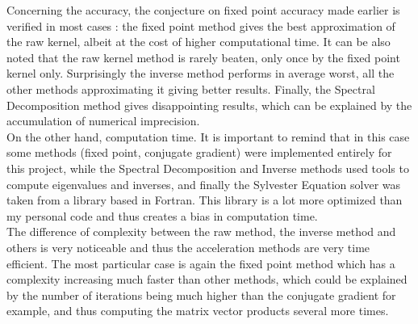 \documentclass{article}
\theoremstyle{definition}
\begin{document}
Concerning the accuracy, the conjecture on fixed point accuracy made earlier is verified in most cases : the fixed point method gives the best approximation of the raw kernel, albeit at the cost of higher computational time. It can be also noted that the raw kernel method is rarely beaten, only once by the fixed point kernel only. Surprisingly the inverse method performs in average worst, all the other methods approximating it giving better results. Finally, the Spectral Decomposition method gives disappointing results, which can be explained by the accumulation of numerical imprecision.\\
On the other hand, computation time. It is important to remind that in this case some methods (fixed point, conjugate gradient) were implemented entirely for this project, while the Spectral Decomposition and Inverse methods used tools to compute eigenvalues and inverses, and finally the Sylvester Equation solver was taken from a library based in Fortran. This library is a lot more optimized than my personal code and thus creates a bias in computation time.\\
The difference of complexity between the raw method, the inverse method and others is very noticeable and thus the acceleration methods are very time efficient. The most particular case is again the fixed point method which has a complexity increasing much faster than other methods, which could be explained by the number of iterations being much higher than the conjugate gradient for example, and thus computing the matrix vector products several more times.
\end{document}
